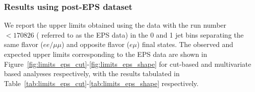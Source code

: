 

\subsubsection{Results using post-EPS dataset}

We report the upper limits obtained using the data with the run number $<170826$ ( referred to 
as the EPS data) in the 0 and 1 jet bins separating the 
same flavor ($ee/\mu\mu$) and opposite flavor ($e\mu$) final states.
The observed and expected upper limits corresponding to the EPS data are shown in 
Figure~\ref{fig:limits_eps_cut}-\ref{fig:limits_eps_shape} for cut-based and multivariate 
based analyeses respectively, with the results tabulated in 
Table~\ref{tab:limits_eps_cut}-\ref{tab:limits_eps_shape} respectively.

